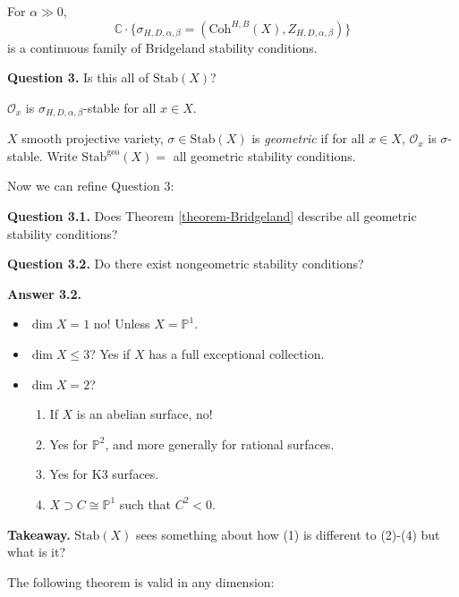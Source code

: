 \begin{theorem}
\label{theorem-Bridgeland}
For $\alpha\gg 0$,
$$
\mathbb{C}\cdot \{\sigma_{H,D,\alpha,\beta}=
(\text{Coh}^{H,B}(X),Z_{H,D,\alpha,\beta})\}
$$
is a continuous family of Bridgeland
stability conditions.
\end{theorem}

\noindent
{\bf Question 3.} Is this all of
$\text{Stab}(X)$?

\begin{exercise}
\label{exercise-O-is-stable}
$\mathcal{O}_x$ is
$\sigma_{H,D,\alpha,\beta}$-stable for all
$x\in X$.
\end{exercise}

\begin{definition}
\label{gscag-label-003}
$X$ smooth projective variety, $\sigma \in
\text{Stab}(X)$ is {\it geometric} if for all
$x \in X$, $\mathcal{O}_x$ is
$\sigma$-stable. Write
$\text{Stab}^{\text{geo}}(X)=$ all geometric
stability conditions.
\end{definition}

\medskip\noindent
Now we can refine Question 3:

\medskip\noindent
{\bf Question 3.1.} Does Theorem
\ref{theorem-Bridgeland} describe all
geometric stability conditions?

\medskip\noindent
{\bf Question 3.2.} Do there exist
nongeometric stability conditions?

\medskip\noindent
{\bf Answer 3.2.}
\begin{itemize}
\item $\dim X=1$ no! Unless $X=\mathbb{P}^1$.
\item $\dim X \leq 3$? Yes if $X$ has a full
exceptional collection.
\item $\dim X=2$?
\begin{enumerate}
\item If $X$ is an abelian surface, no!
\item Yes for $\mathbb{P}^2$, and more
generally for rational surfaces.
\item Yes for K3 surfaces.
\item $X \supset C \cong \mathbb{P}^1$ such
that $C^2 < 0$.
\end{enumerate}
\end{itemize}

\medskip\noindent
{\bf Takeaway.} $\text{Stab}(X)$ sees
something about how (1) is different to
(2)-(4) but what is it?

\medskip\noindent
The following theorem is valid in any
dimension:

